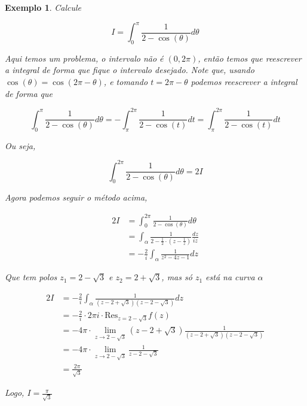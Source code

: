 \documentclass{article}
\newtheorem{ex}{Exemplo}
\begin{document}
\begin{ex}
Calcule

\begin{equation*}
    I = \int_0^\pi \frac{1}{2 - \cos(\theta)} d \theta
\end{equation*}

Aqui temos um problema, o intervalo não é $(0, 2 \pi)$, então temos que reescrever a integral de forma que fique o intervalo desejado. Note que, usando $\cos(\theta) = \cos(2 \pi - \theta)$, e tomando $t = 2 \pi - \theta$ podemos reescrever a integral de forma que

\begin{equation*}
    \int_0^\pi \frac{1}{2 - \cos(\theta)} d \theta = - \int_\pi^{2 \pi} \frac{1}{2 - \cos(t)} d t = \int_\pi^{2 \pi} \frac{1}{2 - \cos(t)} d t
\end{equation*}

Ou seja,

\begin{equation*}
    \int_0^{2 \pi} \frac{1}{2 - \cos(\theta)} d \theta = 2 I
\end{equation*}

Agora podemos seguir o método acima,

\begin{align*}
    2 I &=  \int_0^{2 \pi} \frac{1}{2 - \cos(\theta)} d \theta \\
    &= \int_\alpha \frac{1}{2 - \frac{1}{2} \cdot (z - \frac{1}{z})} \frac{d z}{i z} \\
    &= - \frac{2}{i} \int_\alpha \frac{1}{z^2 - 4z - 1} dz
\end{align*}

Que tem polos $z_1 = 2 - \sqrt{3}$ e $z_2 = 2 + \sqrt{3}$, mas só $z_1$ está na curva $\alpha$

\begin{align*}
    2 I &= - \frac{2}{i} \int_\alpha \frac{1}{(z - 2 + \sqrt{3})(z - 2 - \sqrt{3})} d z \\
    &= - \frac{2}{i} \cdot 2 \pi i \cdot \mathrm{Res}_{z = 2 - \sqrt{3}} f(z) \\
    &= - 4 \pi \cdot \lim_{z \to 2 - \sqrt{3}} (z - 2 + \sqrt{3}) \frac{1}{(z - 2 + \sqrt{3}) (z - 2 - \sqrt{3})} \\
    &= - 4 \pi \cdot \lim_{z \to 2 - \sqrt{3}} \frac{1}{z - 2 - \sqrt{3}} \\
    &= \frac{2 \pi}{\sqrt{3}}
\end{align*}

Logo, $I = \frac{\pi}{\sqrt{3}}$
\end{ex}
\end{document}
